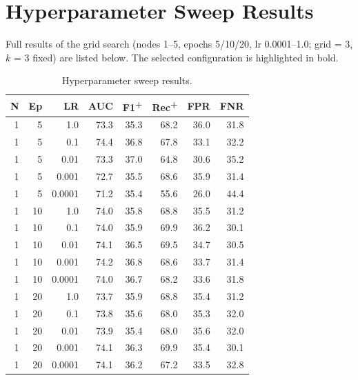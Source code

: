 \documentclass[12pt, a4paper]{article}
\begin{document}
\clearpage


\clearpage
\appendix
\section{Hyperparameter Sweep Results}
\label{app:sweep}

Full results of the grid search (nodes 1--5, epochs 5/10/20, lr 0.0001--1.0; grid = 3, $k$ = 3 fixed) are listed below. The selected configuration is highlighted in bold.

\begin{table}[ht]
\caption{Hyperparameter sweep results.}
\label{tab:sweep}
\begingroup\scriptsize\setlength{\tabcolsep}{3pt}
\begin{minipage}[t]{0.48\textwidth}
\begin{tabular}{rrrrrrrr}
\toprule
N & Ep & LR & AUC & F1\textsuperscript{+} & Rec\textsuperscript{+} & FPR & FNR \\
\midrule
1 & 5 & 1.0 & 73.3 & 35.3 & 68.2 & 36.0 & 31.8 \\
1 & 5 & 0.1 & 74.4 & 36.8 & 67.8 & 33.1 & 32.2 \\
1 & 5 & 0.01 & 73.3 & 37.0 & 64.8 & 30.6 & 35.2 \\
1 & 5 & 0.001 & 72.7 & 35.5 & 68.6 & 35.9 & 31.4 \\
1 & 5 & 0.0001 & 71.2 & 35.4 & 55.6 & 26.0 & 44.4 \\
1 & 10 & 1.0 & 74.0 & 35.8 & 68.8 & 35.5 & 31.2 \\
1 & 10 & 0.1 & 74.0 & 35.9 & 69.9 & 36.2 & 30.1 \\
1 & 10 & 0.01 & 74.1 & 36.5 & 69.5 & 34.7 & 30.5 \\
1 & 10 & 0.001 & 74.2 & 36.8 & 68.6 & 33.7 & 31.4 \\
1 & 10 & 0.0001 & 74.0 & 36.7 & 68.2 & 33.6 & 31.8 \\
1 & 20 & 1.0 & 73.7 & 35.9 & 68.8 & 35.4 & 31.2 \\
1 & 20 & 0.1 & 73.8 & 35.6 & 68.0 & 35.3 & 32.0 \\
1 & 20 & 0.01 & 73.9 & 35.4 & 68.0 & 35.6 & 32.0 \\
1 & 20 & 0.001 & 74.1 & 36.3 & 69.9 & 35.4 & 30.1 \\
1 & 20 & 0.0001 & 74.1 & 36.2 & 67.2 & 33.5 & 32.8 \\

\end{tabular}
\end{minipage}
\end{table}
\end{document}
